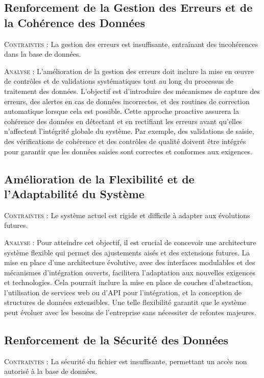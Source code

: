\documentclass[a4paper, oneside, 12pt, final]{extreport}
\begin{document}
\subsection{Renforcement de la Gestion des Erreurs et de la Cohérence des Données}
\textsc{Contraintes} : La gestion des erreurs est insuffisante, entraînant des incohérences dans la base de données.

\textsc{Analyse} : L’amélioration de la gestion des erreurs doit inclure la mise en œuvre de contrôles et de validations systématiques tout au long du processus de traitement des données. L’objectif est d’introduire des mécanismes de capture des erreurs, des alertes en cas de données incorrectes, et des routines de correction automatique lorsque cela est possible. Cette approche proactive assurera la cohérence des données en détectant et en rectifiant les erreurs avant qu’elles n’affectent l’intégrité globale du système. Par exemple, des validations de saisie, des vérifications de cohérence et des contrôles de qualité doivent être intégrés pour garantir que les données saisies sont correctes et conformes aux exigences.

\subsection{Amélioration de la Flexibilité et de l’Adaptabilité du Système}
\textsc{Contraintes} : Le système actuel est rigide et difficile à adapter aux évolutions futures.

\textsc{Analyse} : Pour atteindre cet objectif, il est crucial de concevoir une architecture système flexible qui permet des ajustements aisés et des extensions futures. La mise en place d’une architecture évolutive, avec des interfaces modulables et des mécanismes d'intégration ouverts, facilitera l’adaptation aux nouvelles exigences et technologies. Cela pourrait inclure la mise en place de couches d’abstraction, l’utilisation de services web ou d’API pour l’intégration, et la conception de structures de données extensibles. Une telle flexibilité garantit que le système peut évoluer avec les besoins de l’entreprise sans nécessiter de refontes majeures.

\subsection{Renforcement de la Sécurité des Données}
\textsc{Contraintes} : La sécurité du fichier est insuffisante, permettant un accès non autorisé à la base de données.
\end{document}
